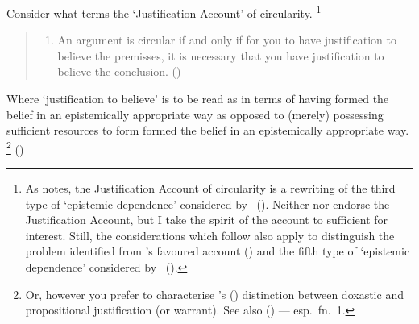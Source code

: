 \begin{note}
  Consider what \citeauthor{Sgaravatti:2013wu} terms the `Justification Account' of circularity.\nolinebreak
  \footnote{
    As \citeauthor{Sgaravatti:2013wu} notes, the Justification Account of circularity is a rewriting of the third type of `epistemic dependence' considered by \citeauthor{Pryor:2004ws}~(\citeyear[359]{Pryor:2004ws}).
    Neither \citeauthor{Pryor:2004ws} nor \citeauthor{Sgaravatti:2013wu} endorse the Justification Account, but I take the spirit of the account to sufficient for interest.
    Still, the considerations which follow also apply to distinguish the {\color{red} problem identified} from \citeauthor{Sgaravatti:2013wu}'s favoured account (\citeyear[\S3]{Sgaravatti:2013wu}) and the fifth type of `epistemic dependence' considered by \citeauthor{Pryor:2004ws}~(\citeyear[359]{Pryor:2004ws}).
  }

  \begin{quote}
    \begin{enumerate}[label=(JA), ref=(JA)]
    \item
      \label{sg:JA}
      An argument is circular if and only if for you to have justification to believe the premisses, it is necessary that you have justification to believe the conclusion.%
      \mbox{}\hfill\mbox{(\citeyear[754]{Sgaravatti:2013wu})}
    \end{enumerate}
  \end{quote}
  Where `justification to believe' is to be read as in terms of having formed the belief in an epistemically appropriate way as opposed to (merely) possessing sufficient resources to form formed the belief in an epistemically appropriate way.\nolinebreak
  \footnote{
    Or, however you prefer to characterise \citeauthor{Firth:1978vi}'s (\citeyear{Firth:1978vi}) distinction between doxastic and propositional justification (or warrant).
    See also \citeauthor{Silva:2020aa} (\citeyear{Silva:2020aa}) --- esp.\ fn.\ 1.
  }
  (\citeyear[754--755]{Sgaravatti:2013wu})
\end{note}


